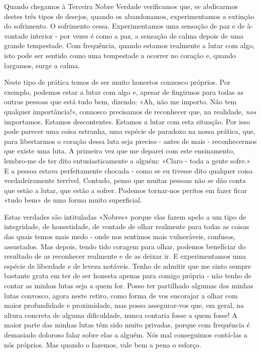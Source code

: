 Quando chegamos à Terceira Nobre Verdade verificamos que, se abdicarmos
destes três tipos de desejos, quando os abandonamos, experimentamos a
extinção do sofrimento. O sofrimento cessa. Experimentamos uma sensação
de paz e de à-vontade interior - por vezes é como a paz, a sensação de
calma depois de uma grande tempestade. Com frequência, quando estamos
realmente a lutar com algo, isto pode ser sentido como uma tempestade a
ocorrer no coração e, quando largamos, surge a calma.

Neste tipo de prática temos de ser muito honestos connosco próprios. Por
exemplo, podemos estar a lutar com algo e, apesar de fingirmos para
todas as outras pessoas que está tudo bem, dizendo: «Ah, não me importo.
Não tem qualquer importância!», connosco precisamos de reconhecer que,
na realidade, \emph{nos} importamos. Estamos descontentes. Estamos a
lutar com esta situação. Por isso pode parecer uma coisa estranha, uma
espécie de paradoxo na nossa prática, que, para libertarmos o coração
dessa luta seja preciso - antes de mais - reconhecermos que existe uma
luta. A primeira vez que me deparei com este ensinamento, lembro-me de
ter dito entusiasticamente a alguém: «Claro - toda a gente sofre.» E a
pessoa estava perfeitamente chocada - como se eu tivesse dito qualquer
coisa verdadeiramente terrível. Contudo, penso que muitas pessoas não se
dão conta que estão a lutar, que estão a sofrer. Podemos tornar-nos
peritos em fazer ficar «tudo bem» de uma forma muito superficial.

Estas verdades são intituladas «Nobres» porque elas fazem apelo a um
tipo de integridade, de honestidade, de vontade de olhar realmente para
todas as coisas das quais temos mais medo - onde nos sentimos mais
vulneráveis, confusos, assustados. Mas depois, tendo tido coragem para
olhar, podemos benefíciar do resultado de as reconhecer realmente e de
as deixar ir. E experimentamos uma espécie de liberdade e de leveza
notáveis. Tenho de admitir que me sinto sempre bastante grata em ter de
ser honesta apenas para comigo própria - não tenho de contar as minhas
lutas seja a quem for. Posso ter partilhado algumas das minhas lutas
convosco, agora neste retiro, como forma de vos encorajar a olhar com
maior profundidade e proximidade, mas posso \mbox{assegurar-vos} que, em geral,
na altura concreta de alguma dificuldade, nunca contaria fosse a quem
fosse! A maior parte das minhas lutas têm sido muito privadas, porque
com frequência é demasiado doloroso falar sobre elas a alguém. Nós mal
conseguimos contá-las a nós próprios. Mas quando o fazemos, vale bem a
pena o esforço.

